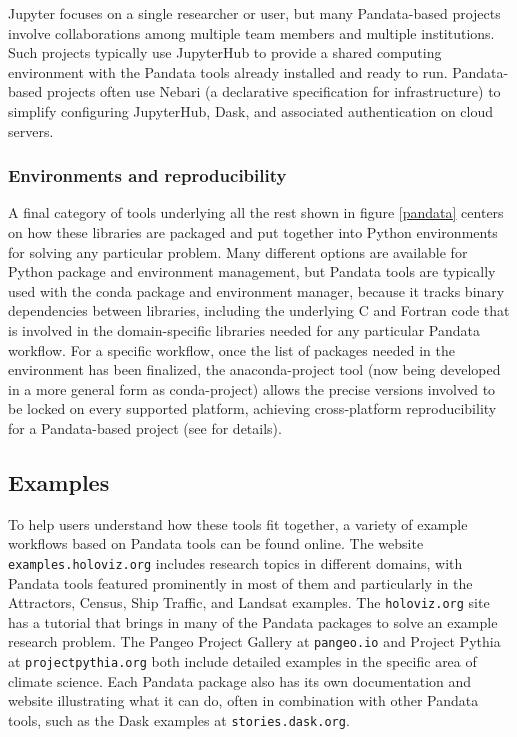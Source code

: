 Jupyter focuses on a single researcher or user, but many Pandata-based projects involve collaborations among multiple team members and multiple institutions. Such projects typically use JupyterHub to provide a shared computing environment with the Pandata tools already installed and ready to run. Pandata-based projects often use Nebari (a declarative specification for infrastructure) to simplify configuring JupyterHub, Dask, and associated authentication on cloud servers.

\subsubsection{Environments and reproducibility}

A final category of tools underlying all the rest shown in figure \ref{pandata} centers on how these libraries are packaged and put together into Python environments for solving any particular problem. Many different options are available for Python package and environment management, but Pandata tools are typically used with the conda package and environment manager, because it tracks binary dependencies between libraries, including the underlying C and Fortran code that is involved in the domain-specific libraries needed for any particular Pandata workflow. For a specific workflow, once the list of packages needed in the environment has been finalized, the anaconda-project tool (now being developed in a more general form as conda-project) allows the precise versions involved to be locked on every supported platform, achieving cross-platform reproducibility for a Pandata-based project (see
\cite{bednar:anaconda22} for details).


\subsection{Examples}

To help users understand how these tools fit together, a variety of example workflows based on Pandata tools can be found online. The website \texttt{examples.holoviz.org} includes research topics in different domains, with Pandata tools featured prominently in most of them and particularly in the Attractors, Census, Ship Traffic, and Landsat examples. The \texttt{holoviz.org} site has a tutorial that brings in many of the Pandata packages to solve an example research problem. The Pangeo Project Gallery at \texttt{pangeo.io} and Project Pythia at \texttt{projectpythia.org} both include detailed examples in the specific area of climate science. Each Pandata package also has its own documentation and website illustrating what it can do, often in combination with other Pandata tools, such as the Dask examples at \texttt{stories.dask.org}.

